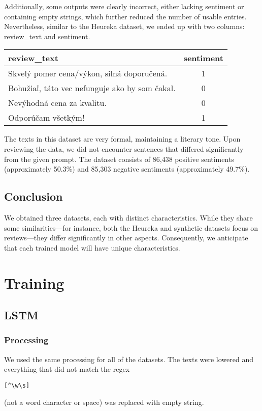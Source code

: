 \documentclass[11pt]{article}
\begin{document}
Additionally, some outputs were clearly incorrect, either lacking sentiment or containing empty strings, which further reduced the number of usable entries. Nevertheless, similar to the Heureka dataset, we ended up with two columns: review\_text and sentiment.

\begin{longtable}{|p{5cm}|c|}
    \hline
    \textbf{review\_text} & \textbf{sentiment} \\
    \hline
    \centering Skvelý pomer cena/výkon, silná doporučená. & 1 \\
    \hline
    \centering Bohužiaľ, táto vec nefunguje ako by som čakal. & 0 \\
    \hline
    \centering  Nevýhodná cena za kvalitu. & 0 \\
    \hline
    \centering Odporúčam všetkým! & 1 \\
    \hline
\end{longtable}

The texts in this dataset are very formal, maintaining a literary tone. Upon reviewing the data, we did not encounter sentences that differed significantly from the given prompt. The dataset consists of 86,438 positive sentiments (approximately 50.3\%) and 85,303 negative sentiments (approximately 49.7\%).

\subsection{Conclusion}
We obtained three datasets, each with distinct characteristics. While they share some similarities—for instance, both the Heureka and synthetic datasets focus on reviews—they differ significantly in other aspects. Consequently, we anticipate that each trained model will have unique characteristics.

\section{Training}
\subsection{LSTM}
\subsubsection{Processing}
We used the same processing for all of the datasets. The texts were lowered and everything that did not match the regex \begin{verbatim}[^\w\s]\end{verbatim} (not a word character or space) was replaced with empty string.
\end{document}
